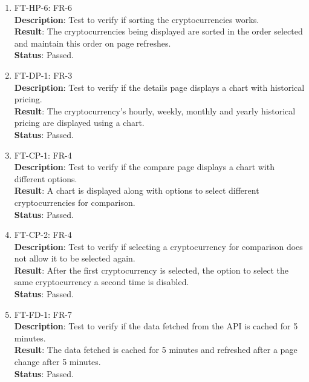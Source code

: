 \documentclass[12pt, titlepage]{article}
\begin{document}
\begin{enumerate}
    \item FT-HP-6: FR-6\\
    \textbf{Description}: Test to verify if sorting the cryptocurrencies works.\\
    \textbf{Result}: The cryptocurrencies being displayed are sorted in the order selected and maintain this order on page refreshes.\\
    \textbf{Status}: Passed.\\
    
    \item FT-DP-1: FR-3\\
    \textbf{Description}: Test to verify if the details page displays a chart with historical pricing.\\
    \textbf{Result}: The cryptocurrency’s hourly, weekly, monthly and yearly historical pricing are displayed using a chart.\\
    \textbf{Status}: Passed.\\
    
    \item FT-CP-1: FR-4\\
    \textbf{Description}: Test to verify if the compare page displays a chart with different options.\\
    \textbf{Result}: A chart is displayed along with options to select different cryptocurrencies for comparison.\\
    \textbf{Status}: Passed.\\
    
    \item FT-CP-2: FR-4\\
    \textbf{Description}: Test to verify if selecting a cryptocurrency for comparison does not allow it to be selected again.\\
    \textbf{Result}: After the first cryptocurrency is selected, the option to select the same cryptocurrency a second time is disabled.\\
    \textbf{Status}: Passed.\\
    
    \item FT-FD-1: FR-7\\
    \textbf{Description}: Test to verify if the data fetched from the API is cached for 5 minutes.\\
    \textbf{Result}: The data fetched is cached for 5 minutes and refreshed after a page change after 5 minutes.\\
    \textbf{Status}: Passed.\\
    

\end{enumerate}
\end{document}
